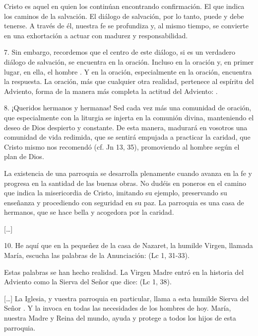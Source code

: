 \begin{body}
					Cristo es aquel en quien los  continúan encontrando confirmación. El que indica los caminos de la salvación. El diálogo de salvación, por lo tanto, puede y debe tenerse. A través de él, nuestra fe se profundiza y, al mismo tiempo, se convierte en una exhortación a actuar con madurez y responsabilidad.
					
					7. Sin embargo, recordemos que el centro de este diálogo, si es un verdadero diálogo de salvación, se encuentra en la oración. Incluso en la oración y, en primer lugar, en ella, el hombre . Y en la oración, especialmente en la oración, encuentra la respuesta. La oración, más que cualquier otra realidad, pertenece al espíritu del Adviento, forma de la manera más completa la actitud del Adviento: .
					
					8. ¡Queridos hermanos y hermanas! Sed cada vez más una comunidad de oración, que especialmente con la liturgia se injerta en la comunión divina, manteniendo el deseo de Dios despierto y constante. De esta manera, madurará en vosotros una comunidad de vida redimida, que se sentirá empujada a practicar la caridad, que Cristo mismo nos recomendó (cf. Jn 13, 35), promoviendo al hombre según el plan de Dios.
					
					La existencia de una parroquia se desarrolla plenamente cuando avanza en la fe y progresa en la santidad de las buenas obras. No dudéis en poneros en el camino que indica la misericordia de Cristo, imitando su ejemplo, preservando su enseñanza y procediendo con seguridad en su paz. La parroquia es una casa de hermanos, que se hace bella y acogedora por la caridad.
					
					[\ldots{}]
					
					10.  He aquí que en la pequeñez de la casa de Nazaret, la humilde Virgen, llamada María, escucha las palabras de la Anunciación:  (Lc 1, 31-33).
					
					Estas palabras se han hecho realidad. La Virgen Madre entró en la historia del Adviento como la Sierva del Señor que dice:  (Lc 1, 38).
					
					{[}\ldots{}{]} La Iglesia, y vuestra parroquia en particular, llama a esta humilde Sierva del Señor . Y la invoca en todas las necesidades de los hombres de hoy. María, nuestra Madre y Reina del mundo, ayuda y protege a todos los hijos de esta parroquia.
				\end{body}

